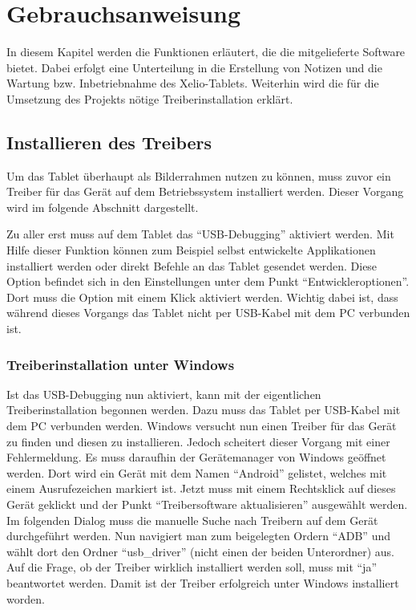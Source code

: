 \chapter{Gebrauchsanweisung}
\vspace*{-3cm}
\begin{flushleft}
In diesem Kapitel werden die Funktionen erläutert, die die mitgelieferte Software bietet. Dabei erfolgt eine Unterteilung in die Erstellung von Notizen und die Wartung bzw. Inbetriebnahme des Xelio-Tablets. Weiterhin wird die für die Umsetzung des Projekts nötige Treiberinstallation erklärt. 

\section{Installieren des Treibers}
Um das Tablet überhaupt als Bilderrahmen nutzen zu können, muss zuvor ein Treiber für das Gerät auf dem Betriebssystem installiert werden. Dieser Vorgang wird im folgende Abschnitt dargestellt.

Zu aller erst muss auf dem Tablet das ``USB-Debugging'' aktiviert werden. Mit Hilfe dieser Funktion können zum Beispiel selbst entwickelte Applikationen installiert werden oder direkt Befehle an das Tablet gesendet werden. Diese Option befindet sich in den Einstellungen unter dem Punkt ``Entwickleroptionen''. Dort muss die Option mit einem Klick aktiviert werden. Wichtig dabei ist, dass während dieses Vorgangs das Tablet nicht per USB-Kabel mit dem PC verbunden ist. 

\subsection{Treiberinstallation unter Windows}
Ist das USB-Debugging nun aktiviert, kann mit der eigentlichen Treiberinstallation begonnen werden. Dazu muss das Tablet per USB-Kabel mit dem PC verbunden werden. Windows versucht nun einen Treiber für das Gerät zu finden und diesen zu installieren. Jedoch scheitert dieser Vorgang mit einer Fehlermeldung. Es muss daraufhin der Gerätemanager von Windows geöffnet werden. Dort wird ein Gerät mit dem Namen ``Android'' gelistet, welches mit einem Ausrufezeichen markiert ist. Jetzt muss mit einem Rechtsklick auf dieses Gerät geklickt und der Punkt ``Treibersoftware aktualisieren'' ausgewählt werden. Im folgenden Dialog muss die manuelle Suche nach Treibern auf dem Gerät durchgeführt werden. Nun navigiert man zum beigelegten Ordern ``ADB'' und wählt dort den Ordner ``usb\_driver'' (nicht einen der beiden Unterordner) aus. Auf die Frage, ob der Treiber wirklich installiert werden soll, muss mit ``ja'' beantwortet werden. Damit ist der Treiber erfolgreich unter Windows installiert worden. 


\end{flushleft}
